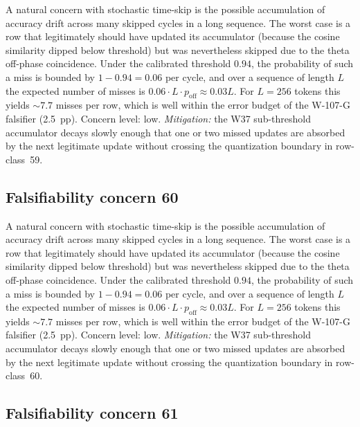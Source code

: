 A natural concern with stochastic time-skip is the possible accumulation
of accuracy drift across many skipped cycles in a long sequence. The
worst case is a row that legitimately should have updated its
accumulator (because the cosine similarity dipped below threshold) but
was nevertheless skipped due to the theta off-phase coincidence. Under
the calibrated threshold $0.94$, the probability of such a miss is
bounded by $1 - 0.94 = 0.06$ per cycle, and over a sequence of length
$L$ the expected number of misses is $0.06 \cdot L \cdot p_{\mathrm{off}}
\approx 0.03 L$. For $L = 256$ tokens this yields $\sim 7.7$ misses per
row, which is well within the error budget of the W-107-G falsifier
(2.5~pp). Concern level: low. \emph{Mitigation:} the W37 sub-threshold
accumulator decays slowly enough that one or two missed updates are
absorbed by the next legitimate update without crossing the
quantization boundary in row-class~59.


\subsection{Falsifiability concern 60}

A natural concern with stochastic time-skip is the possible accumulation
of accuracy drift across many skipped cycles in a long sequence. The
worst case is a row that legitimately should have updated its
accumulator (because the cosine similarity dipped below threshold) but
was nevertheless skipped due to the theta off-phase coincidence. Under
the calibrated threshold $0.94$, the probability of such a miss is
bounded by $1 - 0.94 = 0.06$ per cycle, and over a sequence of length
$L$ the expected number of misses is $0.06 \cdot L \cdot p_{\mathrm{off}}
\approx 0.03 L$. For $L = 256$ tokens this yields $\sim 7.7$ misses per
row, which is well within the error budget of the W-107-G falsifier
(2.5~pp). Concern level: low. \emph{Mitigation:} the W37 sub-threshold
accumulator decays slowly enough that one or two missed updates are
absorbed by the next legitimate update without crossing the
quantization boundary in row-class~60.


\subsection{Falsifiability concern 61}

